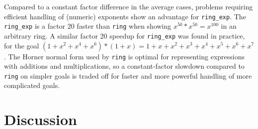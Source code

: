 \documentclass{llncs}
\newcommand{\lean}[1]{\texttt{#1}\xspace} %
\newcommand{\mathlib}{\texttt{mathlib}\xspace}
\newcommand{\ring}{\lean{ring}}
\newcommand{\ringexp}{\lean{ring\_exp}}
\begin{document}
Compared to a constant factor difference in the average cases,
problems requiring efficient handling of (numeric) exponents show an advantage for \ringexp.
The \ringexp is a factor 20 faster than \ring when showing $x^{50} * x^{50} = x^{100}$ in an arbitrary ring.
A similar factor 20 speedup for \ringexp was found in practice, for the goal $(1 + x^2 + x^4 + x^6) * (1 + x) = 1 + x + x^2 + x^3 + x^4 + x^5 + x^6 + x^7$.
The Horner normal form used by \ring is optimal for representing expressions with additions and multiplications,
so a constant-factor slowdown compared to \ring on simpler goals is traded off for faster and more powerful handling of more complicated goals.


% 

%
%


\section{Discussion}
\end{document}
